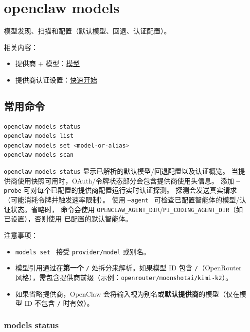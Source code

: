 \section{openclaw models}


模型发现、扫描和配置（默认模型、回退、认证配置）。

相关内容：

\begin{itemize}
  \item 提供商 + 模型：\href{/providers/models}{模型}
  \item 提供商认证设置：\href{/start/getting-started}{快速开始}
\end{itemize}


\subsection{常用命令}


\begin{lstlisting}[language=bash]
openclaw models status
openclaw models list
openclaw models set <model-or-alias>
openclaw models scan
\end{lstlisting}


\texttt{openclaw models status} 显示已解析的默认模型/回退配置以及认证概览。
当提供商使用快照可用时，OAuth/令牌状态部分会包含提供商使用头信息。
添加 \texttt{--probe} 可对每个已配置的提供商配置运行实时认证探测。
探测会发送真实请求（可能消耗令牌并触发速率限制）。
使用 \texttt{--agent } 可检查已配置智能体的模型/认证状态。省略时，
命令会使用 \texttt{OPENCLAW\_AGENT\_DIR}/\texttt{PI\_CODING\_AGENT\_DIR}（如已设置），否则使用
已配置的默认智能体。

注意事项：

\begin{itemize}
  \item \texttt{models set } 接受 \texttt{provider/model} 或别名。
  \item 模型引用通过在\textbf{第一个} \texttt{/} 处拆分来解析。如果模型 ID 包含 \texttt{/}（OpenRouter 风格），需包含提供商前缀（示例：\texttt{openrouter/moonshotai/kimi-k2}）。
  \item 如果省略提供商，OpenClaw 会将输入视为别名或\textbf{默认提供商}的模型（仅在模型 ID 不包含 \texttt{/} 时有效）。
\end{itemize}


\subsubsection{models status}


